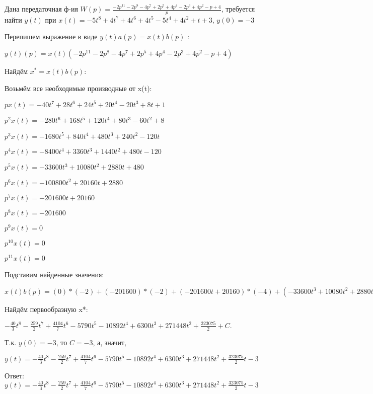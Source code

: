 \documentclass{article}
\begin{document}
Дана передаточная ф-ия $W(p)=\frac{-2p^{11}-2p^{8}-4p^{7}+2p^{5}+4p^{4}-2p^{3}+4p^{2}-p+4}{p}$, требуется найти $y(t)$ при $x(t)=-5t^{8}+4t^{7}+4t^{6}+4t^{5}-5t^{4}+4t^{2}+t+3$, $y(0)=-3$

Перепишем выражение в виде $y(t)a(p)=x(t)b(p)$ :

$y(t)(p)=x(t)(-2p^{11}-2p^{8}-4p^{7}+2p^{5}+4p^{4}-2p^{3}+4p^{2}-p+4)$

Найдём $x^*=x(t)b(p)$:

Возьмём все необходимые производные от x(t):

$px(t)=-40t^{7}+28t^{6}+24t^{5}+20t^{4}-20t^{3}+8t+1$

$p^2x(t)=-280t^{6}+168t^{5}+120t^{4}+80t^{3}-60t^{2}+8$

$p^3x(t)=-1680t^{5}+840t^{4}+480t^{3}+240t^{2}-120t$

$p^4x(t)=-8400t^{4}+3360t^{3}+1440t^{2}+480t-120$

$p^5x(t)=-33600t^{3}+10080t^{2}+2880t+480$

$p^6x(t)=-100800t^{2}+20160t+2880$

$p^7x(t)=-201600t+20160$

$p^8x(t)=-201600$

$p^9x(t)=0$

$p^10x(t)=0$

$p^11x(t)=0$

Подставим найденные значения:

$x(t)b(p) = (0)*(-2)+(-201600)*(-2)+(-201600t+20160)*(-4)+(-33600t^{3}+10080t^{2}+2880t+480)*2+(-8400t^{4}+3360t^{3}+1440t^{2}+480t-120)*4+(-1680t^{5}+840t^{4}+480t^{3}+240t^{2}-120t)*(-2)+(-280t^{6}+168t^{5}+120t^{4}+80t^{3}-60t^{2}+8)*4+(-40t^{7}+28t^{6}+24t^{5}+20t^{4}-20t^{3}+8t+1)*(-1)+(-40t^{7}+28t^{6}+24t^{5}+20t^{4}-20t^{3}+8t+1)*4=-120t^{7}-1036t^{6}+4104t^{5}-34740t^{4}-54460t^{3}+25200t^{2}+814344t$





Найдём первообразную x*:

$-\frac{40}{3}t^{8}-\frac{259}{2}t^{7}+\frac{4104}{7}t^{6}-5790t^{5}-10892t^{4}+6300t^{3}+271448t^{2}+\frac{323075}{2}+C.$

Т.к. $y(0)=-3$, то $C=-3$, а, значит, 

$y(t)=-\frac{40}{3}t^{8}-\frac{259}{2}t^{7}+\frac{4104}{7}t^{6}-5790t^{5}-10892t^{4}+6300t^{3}+271448t^{2}+\frac{323075}{2}t-3$

Ответ: $y(t) = -\frac{40}{3}t^{8}-\frac{259}{2}t^{7}+\frac{4104}{7}t^{6}-5790t^{5}-10892t^{4}+6300t^{3}+271448t^{2}+\frac{323075}{2}t-3$
\end{document}
